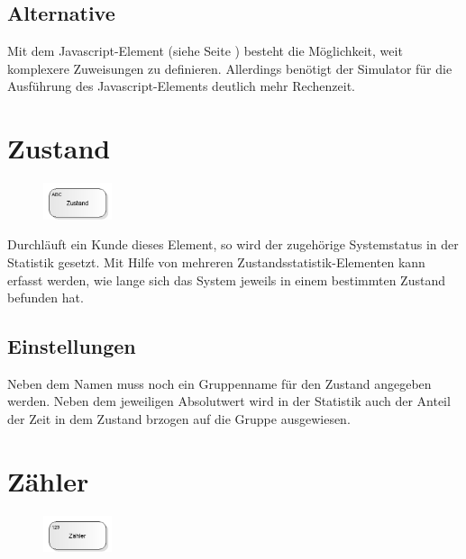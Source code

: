 \subsection*{Alternative}

Mit dem Javascript-Element (siehe Seite \pageref{ref:ModelElementSetJS}) besteht die Möglichkeit, weit komplexere
Zuweisungen zu definieren. Allerdings benötigt der Simulator für die Ausführung
des Javascript-Elements deutlich mehr Rechenzeit.


\section{Zustand}
\label{ref:ModelElementStateStatistics}

\begin{figure}
\vspace{-22pt}
\includegraphics[width=2cm]{imageModelElementStateStatistics.png}
\vspace{-22pt}
\end{figure}

Durchläuft ein Kunde dieses Element, so wird der zugehörige Systemstatus in der Statistik gesetzt. 
Mit Hilfe von mehreren Zustandsstatistik-Elementen kann erfasst werden, wie lange sich das System
jeweils in einem bestimmten Zustand befunden hat.

\subsection*{Einstellungen}

Neben dem Namen muss noch ein Gruppenname für den Zustand angegeben werden. Neben dem jeweiligen
Absolutwert wird in der Statistik auch der Anteil der Zeit in dem Zustand brzogen auf die Gruppe ausgewiesen.


\section{Zähler}
\label{ref:ModelElementCounter}

\begin{figure}
\vspace{-22pt}
\includegraphics[width=2cm]{imageModelElementCounter.png}
\vspace{-22pt}
\end{figure}


